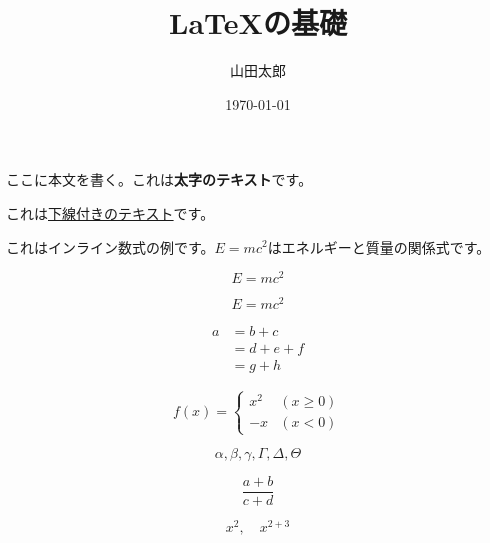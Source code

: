 \documentclass{article}
\title{LaTeXの基礎}
\author{山田太郎}
\date{\today}
\begin{document}
\maketitle

ここに本文を書く。これは\textbf{太字のテキスト}です。

これは\underline{下線付きのテキスト}です。

これはインライン数式の例です。$E=mc^2$はエネルギーと質量の関係式です。

\[
  E=mc^2
\]

\begin{equation}
  E=mc^2
\end{equation}

\begin{align}
  a & =b+c   \\
    & =d+e+f \\
    & =g+h
\end{align}

\begin{equation}
  f(x) =
  \begin{cases}
    x^2 & (x \geq 0) \\
    -x  & (x < 0)
  \end{cases}
\end{equation}

\[
  \alpha, \beta, \gamma, \Gamma, \Delta, \Theta
\]

\[
  \frac{a+b}{c+d}
\]

\[
  x^2,\quad x^{2+3}
\]
\end{document}

